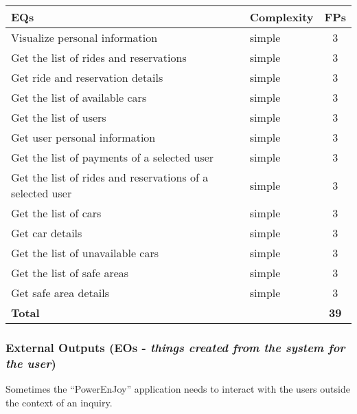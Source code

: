 \begin{center}
	\begin{tabular}{|l|l|c|}
		\hline
		\textbf{EQs} 	& \textbf{Complexity} 	& \textbf{FPs} \\
		\hline
		Visualize personal information 	& simple 	& 3 \\
		Get the list of rides and reservations 	& simple 	& 3 \\
		Get ride and reservation details 	& simple 	& 3 \\
		Get the list of available cars 	& simple 	& 3 \\
		Get the list of users 	& simple 	& 3 \\
		Get user personal information 	& simple 	& 3 \\
		Get the list of payments of a selected user 	& simple 	& 3\\
		Get the list of rides and reservations of a selected user 	& simple 	& 3 \\
		Get the list of cars 	& simple 	& 3 \\
		Get car details 	& simple 	& 3 \\
		Get the list of unavailable cars 	& simple 	& 3 \\
		Get the list of safe areas 	& simple 	& 3 \\
		Get safe area details 	& simple 	& 3 \\
		\hline \hline
		\textbf{Total} 	& 	& \textbf{39} \\
		\hline
	\end{tabular}
\end{center}

\subsubsection{External Outputs (EOs - \textit{things created from the system for the user})}

Sometimes the ``PowerEnJoy'' application needs to interact with the users outside the context of an inquiry.

